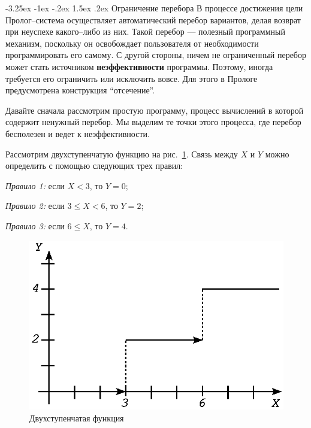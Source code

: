\documentclass[12pt, openany, twoside]{book} %
\makeatletter
\renewcommand\section{\@startsection {section}{1}{\z@}%
                                   {-3.25ex \@plus -1ex \@minus -.2ex}%
                                   {1.5ex \@plus.2ex}%
                                   {\normalfont\large\bfseries}}
\makeatother
\begin{document}
\section{Ограничение перебора}
В процессе достижения цели Пролог--система осуществляет автоматический перебор вариантов, делая возврат при неуспехе како\-го--либо из них. Такой перебор --- полезный программный механизм, поскольку он освобождает пользователя от необходимости программировать его самому. С другой стороны, ничем не ограниченный перебор может стать источником {\bf неэффективности} программы. Поэтому, иногда требуется его ограничить или исключить вовсе. Для этого в Прологе предусмотрена конструкция ``отсечение''.

Давайте сначала рассмотрим простую программу, процесс вычислений в которой содержит ненужный перебор. Мы выделим те точки этого процесса, где перебор бесполезен и ведет к неэффективности.

Рассмотрим двухступенчатую функцию на рис.~\ref{pic:func_step}. Связь между $X$ и $Y$ можно определить с помощью следующих трех правил:

\emph{Правило 1:} если $X < 3$, то $Y = 0$;

\emph{Правило 2:} если $3 \leq X < 6$, то $Y = 2$;

\emph{Правило 3:} если $6 \leq X$, то $Y = 4$.

\begin{figure}[ht]
\begin{center}
\includegraphics[scale=0.7]{pics/func_step.eps}
\end{center}
\caption{Двухступенчатая функция} \label{pic:func_step}
\end{figure}
\end{document}
